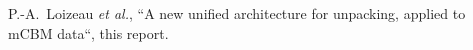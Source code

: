 \documentclass{CBM-PR-2019}
\begin{document}





\begin{thebibliography}{9}   %

 P.-A.~Loizeau \textit{et al.}, ``A new unified architecture for unpacking, applied to mCBM data``, this report.




\end{thebibliography}
\end{document}
